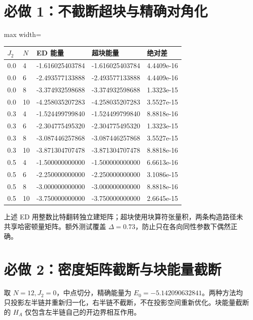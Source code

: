 \documentclass[zihao=5,a4paper]{ctexart}
\begin{document}
\section{必做 1：不截断超块与精确对角化}

\begin{center}
\small
\begin{adjustbox}{max width=\linewidth}
\begin{tabular}{lllll}
\toprule
$J_2$ & $N$ & ED 能量 & 超块能量 & 绝对差 \\
\midrule
0.0 & 4 & -1.616025403784 & -1.616025403784 & 4.4409e-16 \\
0.0 & 6 & -2.493577133888 & -2.493577133888 & 4.4409e-16 \\
0.0 & 8 & -3.374932598688 & -3.374932598688 & 1.3323e-15 \\
0.0 & 10 & -4.258035207283 & -4.258035207283 & 3.5527e-15 \\
0.3 & 4 & -1.524499799840 & -1.524499799840 & 8.8818e-16 \\
0.3 & 6 & -2.304775495320 & -2.304775495320 & 1.3323e-15 \\
0.3 & 8 & -3.087446257868 & -3.087446257868 & 3.5527e-15 \\
0.3 & 10 & -3.871304707478 & -3.871304707478 & 8.8818e-16 \\
0.5 & 4 & -1.500000000000 & -1.500000000000 & 6.6613e-16 \\
0.5 & 6 & -2.250000000000 & -2.250000000000 & 3.1086e-15 \\
0.5 & 8 & -3.000000000000 & -3.000000000000 & 8.8818e-16 \\
0.5 & 10 & -3.750000000000 & -3.750000000000 & 2.6645e-15 \\
\bottomrule
\end{tabular}
\end{adjustbox}
\end{center}

上述 ED 用整数比特翻转独立建矩阵；超块使用块算符张量积，两条构造路径未共享哈密顿量矩阵。额外测试覆盖 $\Delta=0.73$，防止只在各向同性参数下偶然正确。


\section{必做 2：密度矩阵截断与块能量截断}

取 $N=12,J_2=0$，中点切分，精确能量为 $E_0=-5.142090632841$。两种方法均只投影左半链并重新归一化，右半链不截断，不在投影空间重新优化。块能量截断的 $H_A$ 仅包含左半链自己的开边界相互作用。
\end{document}
